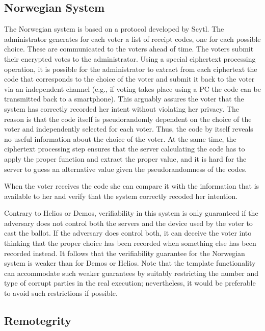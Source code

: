 \subsection{Norwegian System}

The Norwegian system \cite{gjosteen2012} is based on a protocol
developed by Scytl. The administrator generates for each voter a list
of receipt codes, one for each possible choice. These are communicated
to the voters ahead of time. The voters submit their encrypted votes
to the administrator. Using a special ciphertext processing operation,
it is possible for the administrator to extract from each ciphertext
the code that corresponds to the choice of the voter and submit it
back to the voter via an independent channel (e.g., if voting takes
place using a PC the code can be transmitted back to a smartphone).
This arguably assures the voter that the system has correctly recorded
her intent without violating her privacy. The reason is that the code
itself is pseudorandomly dependent on the choice of the voter and
independently selected for each voter. Thus, the code by itself
reveals no useful information about the choice of the voter. At the
same time, the ciphertext processing step ensures that the server
calculating the code has to apply the proper function and extract the
proper value, and it is hard for the server to guess an alternative
value given the pseudorandomness of the codes.

When the voter receives the code she can compare it with the
information that is available to her and verify that the system
correctly recoded her intention.

Contrary to Helios or Demos, verifiability in this system is only
guaranteed if the adversary does not control both the servers and the
device used by the voter to cast the ballot. If the adversary does
control both, it can deceive the voter into thinking that the proper
choice has been recorded when something else has been recorded
instead. It follows that the verifiability guarantee for the Norwegian
system is weaker than for Demos or Helios. Note that the template
functionality can accommodate such weaker guarantees by suitably
restricting the number and type of corrupt parties in the real
execution; nevertheless, it would be preferable to avoid such
restrictions if possible.

\subsection{Remotegrity}

